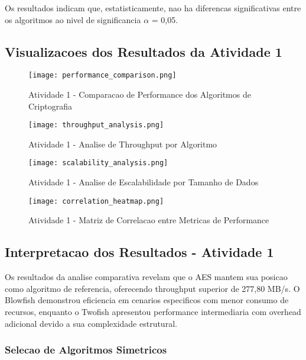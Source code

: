\documentclass[12pt,a4paper,oneside]{article}
\begin{document}
Os resultados indicam que, estatisticamente, nao ha diferencas significativas entre os algoritmos ao nivel de significancia $\alpha$ = 0,05.

\subsection{Visualizacoes dos Resultados da Atividade 1}

\begin{figure}[H]
\centering
\texttt{[image: performance\_comparison.png]}
\caption{Atividade 1 - Comparacao de Performance dos Algoritmos de Criptografia}
\label{fig:performance1}
\end{figure}

\begin{figure}[H]
\centering
\texttt{[image: throughput\_analysis.png]}
\caption{Atividade 1 - Analise de Throughput por Algoritmo}
\label{fig:throughput1}
\end{figure}

\begin{figure}[H]
\centering
\texttt{[image: scalability\_analysis.png]}
\caption{Atividade 1 - Analise de Escalabilidade por Tamanho de Dados}
\label{fig:scalability1}
\end{figure}

\begin{figure}[H]
\centering
\texttt{[image: correlation\_heatmap.png]}
\caption{Atividade 1 - Matriz de Correlacao entre Metricas de Performance}
\label{fig:correlation1}
\end{figure}

\subsection{Interpretacao dos Resultados - Atividade 1}

Os resultados da analise comparativa revelam que o AES mantem sua posicao como algoritmo de referencia, oferecendo throughput superior de 277,80 MB/s. O Blowfish demonstrou eficiencia em cenarios especificos com menor consumo de recursos, enquanto o Twofish apresentou performance intermediaria com overhead adicional devido a sua complexidade estrutural.

\subsubsection{Selecao de Algoritmos Simetricos}
\end{document}
